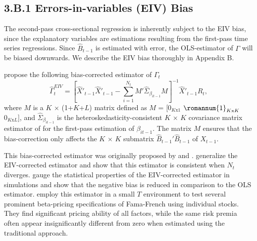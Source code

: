 \subsection*{3.B.1 \hspace{0.1cm} Errors-in-variables (EIV) Bias}
The second-pass cross-sectional regression is inherently subject to the EIV bias, since the explanatory variables are estimations resulting from the first-pass time series regressions. Since $\hat{B}_{t-1}$ is estimated with error, the OLS-estimator of $\Gamma$ will be biased downwards. We describe the EIV bias thoroughly in Appendix B. 
\par \citet{chordia2015cross} propose the following bias-corrected estimator of $\Gamma_t$ 
\begin{equation}
\label{shanken}
    \hat{\Gamma}^{EIV}_t = \left[\hat{X}'_{t-1}\hat{X}'_{t-1} - \sum^{N_t}_{i=1}M'\hat{\Sigma}_{\beta_{it-1}}M\right]^{-1}\hat{X}'_{t-1}R_t,
\end{equation}
where $M$ is a $K$ $\times$ (1+$K$+$L$) matrix defined as $M$ = [$0_{K\text{x}1}$ $\romannum{1}_{K\text{x}K}$ $0_{K\text{x}L}$], and $\hat{
\Sigma}_{\beta_{it-1}}$ is the heteroskedasticity-consistent $K$ $\times$ $K$ covariance matrix estimator of \citet{white1980heteroskedasticity} for the first-pass estimation of $\beta_{it-1}$. The matrix $M$ ensures that the bias-correction only affects the $K$ $\times$ $K$ submatrix $\hat{B}_{t-1}'\hat{B}_{t-1}$ of $X_{t-1}$. 
\par This bias-corrected estimator was originally proposed by \citet{theil1971principles} and \citet{litzenberger1979effect}. 
\citet{shanken1992estimation} generalize the EIV-corrected estimator and show that this estimator is consistent when $N_t$ diverges. \citet{chordia2015cross} gauge the statistical properties of the EIV-corrected estimator in simulations and show that the negative bias is reduced in comparison to the OLS estimator. \citet{raponi2017testing} employ this estimator in a small $T$ environment to test several prominent beta-pricing specifications of Fama-French using individual stocks. They find significant pricing ability of all factors, while the same risk premia often appear insignificantly different from zero when estimated using the traditional approach.  
